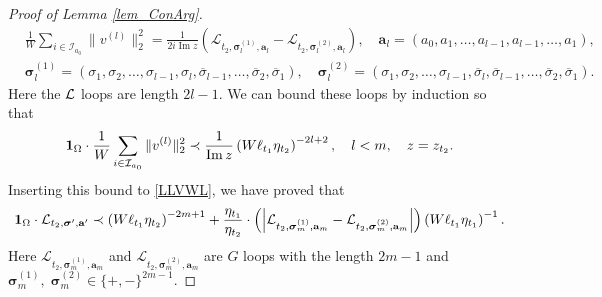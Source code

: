 \documentclass[10pt,reqno]{article}
\renewcommand{\bar}{\overline}
\theoremstyle{plain} %
\theoremstyle{remark}
\numberwithin{equation}{section}
\begin{document}
\begin{proof}[Proof of Lemma \ref{lem_ConArg}]
\begin{align} 
 &   \frac{1}{W} \sum_{i \in \mathcal{I}_{a_0}} \|v^{(l)}\|_2^2  = \frac{1}{2i \operatorname{Im} z} \left( \mathcal{L}_{t_2, \boldsymbol{\sigma}_l^{(1)}, \textbf{a}_l} - \mathcal{L}_{t_2, \boldsymbol{\sigma}_l^{(2)}, \textbf{a}_l} \right), \quad 
     \textbf{a}_l = (a_0, a_1, \ldots, a_{l-1}, a_{l-1}, \ldots, a_1), \nonumber \\
& \boldsymbol{\sigma}_l^{(1)}  = (\sigma_1, \sigma_2, \ldots, \sigma_{l-1}, \sigma_l, \bar{\sigma}_{l-1}, \ldots, \bar{\sigma}_2, \bar{\sigma}_1),\quad 
\boldsymbol{\sigma}_l^{(2)}  = (\sigma_1, \sigma_2, \ldots, \sigma_{l-1}, \bar{\sigma}_l, \bar{\sigma}_{l-1}, \ldots, \bar{\sigma}_2, \bar{\sigma}_1).    
\end{align} 
Here the  $\cal L$ loops are length $2l-1$. 
We can bound these loops by  induction so that 
$$
  {\bf 1}_{\Omega}\cdot   \frac{1}{W} \sum_{i \in \mathcal{I}_{a_0}} \|v^{(l)}\|_2^2 \prec \frac{1}{\operatorname{Im} z} \left( W \ell_{t_1} \eta_{t_2} \right)^{-2l+2}, \quad l < m,\quad z=z_{t_2}. 
$$
Inserting  this bound  to \eqref{LLVWL},   we have proved that
    \begin{equation}\label{LWLIMZ}
      {\bf 1}_{\Omega}\cdot    \mathcal{L}_{t_2, \boldsymbol{\sigma}', \textbf{a}'} \prec \left( W \ell_{t_1} \eta_{t_2} \right)^{-2m+1} + \frac{\eta_{t_1}}{\eta_{t_2}}
        \cdot
        \left(
        \left|\mathcal{L}_{t_2, \boldsymbol{\sigma}_m^{(1)}, \textbf{a}_m} - \mathcal{L}_{t_2, \boldsymbol{\sigma}_m^{(2)}, \textbf{a}_m}\right| \right) \left( W \ell_{t_1}\eta_{t_1} \right)^{-1}.
\end{equation}
Here $\mathcal{L}_{t_2, \boldsymbol{\sigma}_m^{(1)}, \textbf{a}_m}$ and $\mathcal{L}_{t_2, \boldsymbol{\sigma}_m^{(2)}, \textbf{a}_m}$ are   $G$ loops with the length $2m-1$ and   $\boldsymbol{\sigma}_m^{(1)}, \; \boldsymbol{\sigma}_m^{(2)}\in \{+,-\}^{2m-1}$.


\end{proof}
\end{document}
